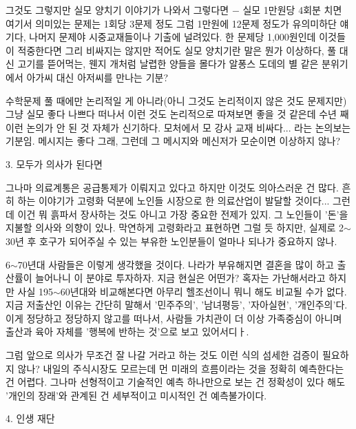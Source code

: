 그것도 그렇지만 실모 양치기 이야기가 나와서 그렇다면 $-$ 실모 1만원당 4회분 치면 여기서 의미있는 문제는 1회당 3문제 정도
그럼 1만원에 12문제 정도가 유의미하단 얘기다, 나머지 문제야 시중교재들이나 기출에 널려있다.
한 문제당 1,000원인데 이것들이 적중한다면 그리 비싸지는 않지만 적어도 실모 양치기란 말은 뭔가 이상하다,
풀 대신 고기를 뜯어먹는, 웬지 개처럼 날렵한 양들을 몰다가 알퐁스 도데의 별 같은 분위기에서 아가씨 대신 아저씨를 만나는 기분?
\vspace{5mm}

수학문제 풀 때에만 논리적일 게 아니라(아니 그것도 논리적이지 않은 것도 문제지만)
그냥 실모 좋다 나쁘다 떠나서 이런 것도 논리적으로 따져보면 좋을 것 같은데 수년 째 이런 논의가 안 된 것 자체가 신기하다.
모처에서 모 강사 교재 비싸다... 라는 논의보는 기분임. 메시지는 좋다 그래, 그런데 그 메시지와 메신저가 모순이면 이상하지 않나?
\vspace{5mm}

\item 3. 모두가 의사가 된다면
\vspace{5mm}

그나마 의료계통은 공급통제가 이뤄지고 있다고 하지만 이것도 의아스러운 건 많다.
흔히 하는 이야기가 고령화 덕분에 노인들 시장으로 한 의료산업이 발달할 것이다...
그런데 이건 뭐 흙파서 장사하는 것도 아니고 가장 중요한 전제가 있지. 그 노인들이 '돈'을 지불할 의사와 의향이 있나.
막연하게 고령화라고 표현하면 그럴 듯 하지만, 실제로 2$\sim$30년 후 호구가 되어주실 수 있는 부유한 노인분들이 얼마나 되나가 중요하지 않나.
\vspace{5mm}

6$\sim$70년대 사람들은 이렇게 생각했을 것이다. 나라가 부유해지면 결혼을 많이 하고 출산률이 늘어나니 이 분야로 투자하자.
지금 현실은 어떤가? 혹자는 가난해서라고 하지만 사실 195$\sim$60년대와 비교해본다면 아무리 헬조선이니 뭐니 해도 비교될 수가 없다.
지금 저출산인 이유는 간단히 말해서 '민주주의', '남녀평등', '자아실현', '개인주의'다.
이게 정당하고 정당하지 않고를 떠나서, 사람들 가치관이 더 이상 가족중심이 아니며 출산과 육아 자체를 '행복에 반하는 것'으로 보고 있어서디ㅏ.
\vspace{5mm}

그럼 앞으로 의사가 무조건 잘 나갈 거라고 하는 것도 이런 식의 섬세한 검증이 필요하지 않나?
내일의 주식시장도 모르는데 먼 미래의 흐름이라는 것을 정확히 예측한다는 건 어렵다.
그나마 선형적이고 기술적인 예측 하나만으로 보는 건 정확성이 있다 해도 '개인의 장래'와 관계된 건 세부적이고 미시적인 건 예측불가이다.
\vspace{5mm}

\item 4. 인생 재단
\vspace{5mm}

